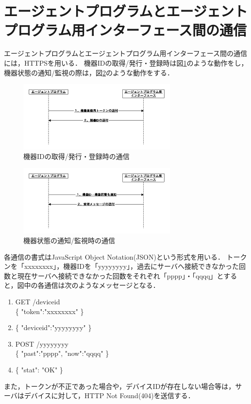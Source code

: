 \section{エージェントプログラムとエージェントプログラム用インターフェース間の通信}
エージェントプログラムとエージェントプログラム用インターフェース間の通信には，HTTPSを用いる．
機器IDの取得/発行・登録時は図\ref{fig:inter_program_regist}のような動作をし，機器状態の通知/監視の際は，図\ref{fig:inter_program_monit}のような動作をする．
\begin{figure}[htbp]
\includegraphics[width=8cm]{images/inter_program_regist.png}
\caption{機器IDの取得/発行・登録時の通信}
\label{fig:inter_program_regist}
\end{figure}
\begin{figure}[htbp]
\includegraphics[width=8cm]{images/inter_program_monit.png}
\caption{機器状態の通知/監視時の通信}
\label{fig:inter_program_monit}
\end{figure}

各通信の書式はJavaScript Object Notation(JSON)という形式を用いる．
トークンを「xxxxxxxx」，機器IDを「yyyyyyyy」，過去にサーバへ接続できなかった回数と現在サーバへ接続できなかった回数をそれぞれ「pppp」・「qqqq」とすると，図中の各通信は次のようなメッセージとなる．
\begin{enumerate}
\item GET /deviceid\\
	\{ "token":"xxxxxxxx" \}
\item \{ "deviceid":"yyyyyyyy" \}
\item POST /yyyyyyyy\\
	\{ "past":"pppp", "now":"qqqq" \}
\item \{ "stat": "OK" \}
\end{enumerate}
また，トークンが不正であった場合や，デバイスIDが存在しない場合等は，サーバはデバイスに対して，HTTP Not Found(404)を送信する．


